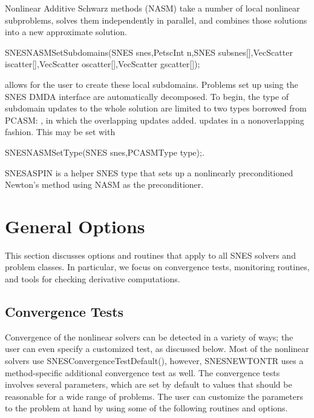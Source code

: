 Nonlinear Additive Schwarz methods (NASM) take a number of local nonlinear
subproblems, solves them independently in parallel, and combines those solutions
into a new approximate solution.
\begin{tabbing}
SNESNASMSetSubdomains(SNES snes,PetscInt n,SNES subsnes[],VecScatter iscatter[],VecScatter oscatter[],VecScatter gscatter[]);
\end{tabbing}
 allows for the user to create these local subdomains.  Problems set up using the SNES DMDA interface are automatically
decomposed.  To begin, the type of subdomain updates to the whole solution are limited to two types borrowed from
PCASM: , in which the overlapping updates added.   updates in a nonoverlapping
fashion.  This may be set with
\begin{tabbing}
        SNESNASMSetType(SNES snes,PCASMType type);.
\end{tabbing}
SNESASPIN is a helper SNES type that sets up a nonlinearly preconditioned Newton's
method using NASM as the preconditioner.

\section{General Options}

This section discusses options and routines that apply to all SNES
solvers and problem classes.  In particular, we focus on convergence
tests, monitoring routines, and tools for checking derivative
computations.

\subsection{Convergence Tests}
\label{sec_snesconvergence}

Convergence of the nonlinear solvers can be detected in a variety of ways; the
user can even specify a customized test, as discussed below.  Most of the nonlinear solvers use SNESConvergenceTestDefault(), however,
SNESNEWTONTR uses a method-specific additional convergence test as well.  The
 convergence tests involves several parameters, which are set by default
to values that should be reasonable for a wide range of problems.  The user can
customize the parameters to the problem at hand by using some of the following
routines and options.

